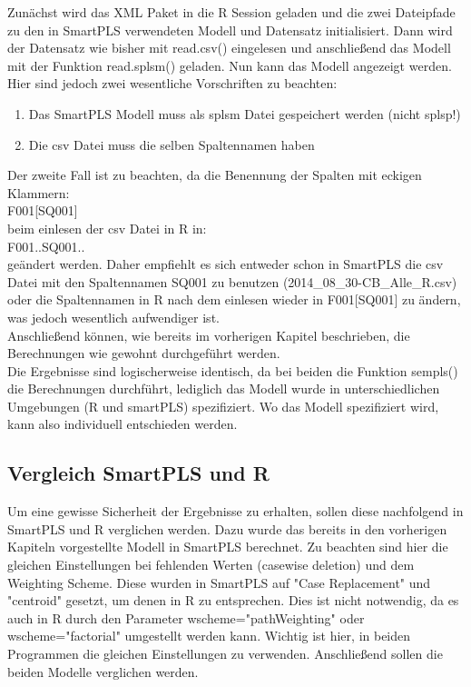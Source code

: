 \documentclass{article}\usepackage[]{graphicx}\usepackage[]{color}
\begin{document}
Zunächst wird das XML Paket in die R Session geladen und die zwei Dateipfade zu den in SmartPLS verwendeten Modell und Datensatz initialisiert. Dann wird der Datensatz wie bisher mit read.csv() eingelesen und anschließend das Modell mit der Funktion read.splsm() geladen. Nun kann das Modell angezeigt werden.\\
Hier sind jedoch zwei wesentliche Vorschriften zu beachten:
\begin{enumerate}
    \item Das SmartPLS Modell muss als splsm Datei gespeichert werden (nicht splsp!)
    \item Die csv Datei muss die selben Spaltennamen haben
\end{enumerate}
Der zweite Fall ist zu beachten, da die Benennung der Spalten mit eckigen Klammern: \\
F001[SQ001]\\
beim einlesen der csv Datei in R in:\\
F001..SQ001..\\
geändert werden. Daher empfiehlt es sich entweder schon in SmartPLS die csv Datei mit den Spaltennamen
SQ001 zu benutzen (2014\_08\_30-CB\_Alle\_R.csv) oder die Spaltennamen in R nach dem einlesen wieder in F001[SQ001] zu ändern, was jedoch wesentlich aufwendiger ist.\\
Anschließend können, wie bereits im vorherigen Kapitel beschrieben, die Berechnungen wie gewohnt durchgeführt werden.\\ Die Ergebnisse sind logischerweise identisch, da bei beiden die Funktion sempls() die Berechnungen durchführt, lediglich das Modell wurde in unterschiedlichen Umgebungen (R und smartPLS) spezifiziert. Wo das Modell spezifiziert wird, kann also individuell entschieden werden.
\\

\subsection{Vergleich SmartPLS und R}
Um eine gewisse Sicherheit der Ergebnisse zu erhalten, sollen diese nachfolgend in SmartPLS und R verglichen werden. Dazu wurde das bereits in den vorherigen Kapiteln vorgestellte Modell in SmartPLS berechnet. Zu beachten sind hier die gleichen Einstellungen bei fehlenden Werten (casewise deletion) und dem Weighting Scheme. Diese wurden in SmartPLS auf "Case Replacement" und "centroid" gesetzt, um denen in R zu entsprechen. Dies ist nicht notwendig, da es auch in R durch den Parameter wscheme="pathWeighting" oder wscheme="factorial"  umgestellt werden kann. Wichtig ist hier, in beiden Programmen die gleichen Einstellungen zu verwenden. Anschließend sollen die beiden Modelle verglichen werden.
\pagebreak
\end{document}

